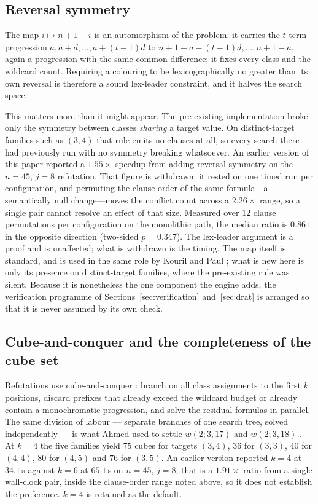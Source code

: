 \documentclass[12pt]{article}
\theoremstyle{remark}
\begin{document}
\subsection{Reversal symmetry}\label{sec:revsym}

The map $i \mapsto n+1-i$ is an automorphism of the problem: it carries the
$t$-term progression $a, a+d, \dots, a+(t-1)d$ to
$n+1-a-(t-1)d, \dots, n+1-a$, again a progression with the same common
difference; it fixes every class and the wildcard count. Requiring a
colouring to be lexicographically no greater than its own reversal is
therefore a sound lex-leader constraint, and it halves the search space.

This matters more than it might appear. The pre-existing implementation broke
only the symmetry between classes \emph{sharing} a target value. On
distinct-target families such as $(3,4)$ that rule emits no clauses at all,
so every search there had previously run with no symmetry breaking
whatsoever. An earlier version of this paper reported a $1.55\times$ speedup
from adding reversal symmetry on the $n=45$, $j=8$ refutation. That figure is
withdrawn: it rested on one timed run per configuration, and permuting the
clause order of the same formula---a semantically null change---moves the
conflict count across a $2.26\times$ range, so a single pair cannot resolve an
effect of that size. Measured over $12$ clause permutations per configuration
on the monolithic path, the median ratio is $0.861$ in the opposite direction
(two-sided $p=0.347$). The lex-leader argument is a proof and is unaffected;
what is withdrawn is the timing. The map itself is standard, and is used in
the same role by Kouril and Paul \cite{kourilpaul}; what is new here is only
its presence on distinct-target families, where the pre-existing rule was
silent. Because it is nonetheless the one component the engine adds, the
verification programme of Sections~\ref{sec:verification}
and~\ref{sec:drat} is arranged so that it is never assumed by its own check.

\subsection{Cube-and-conquer and the completeness of the cube set}\label{sec:cube}

Refutations use cube-and-conquer \cite{cubeandconquer}: branch on all class
assignments to the first $k$ positions, discard prefixes that already exceed
the wildcard budget or already contain a monochromatic progression, and solve
the residual formulas in parallel. The same division of labour --- separate
branches of one search tree, solved independently --- is what Ahmed used to
settle $w(2;3,17)$ and $w(2;3,18)$ \cite{ahmed2010}. At $k=4$ the five families yield $75$
cubes for targets $(3,4)$, $36$ for $(3,3)$, $40$ for $(4,4)$, $80$ for
$(4,5)$ and $76$ for $(3,5)$. An earlier version reported $k=4$ at $34.1$\,s against
$k=6$ at $65.1$\,s on $n=45$, $j=8$; that is a $1.91\times$ ratio from a single
wall-clock pair, inside the clause-order range noted above, so it does not
establish the preference. $k=4$ is retained as the default.
\end{document}
